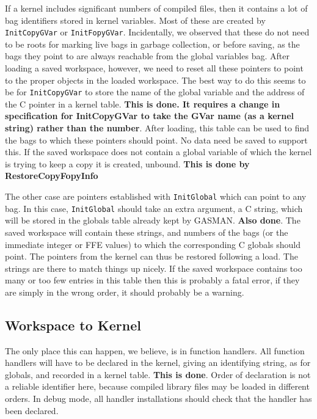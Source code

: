 \documentclass[11pt]{article}
\begin{document}
If a kernel includes significant numbers of compiled files, then it
contains a lot of bag identifiers stored in kernel variables. Most of
these are created by \verb|InitCopyGVar| or
\verb|InitFopyGVar|. Incidentally, we observed that these do not need
to be roots for marking live bags in garbage collection, or before
saving, as the bags they point to are always reachable from the global
variables bag. After loading a saved workspace, however, we need to
reset all these pointers to point to the proper objects in the loaded
workspace.  The best way to do this seems to be for
\verb|InitCopyGVar| to store the name of the global variable and the
address of the C pointer in a kernel table. \textbf{This is done. It
requires a change in specification for InitCopyGVar to take the GVar
name (as a kernel string) rather than the number}. After loading, this
table can be used to find the bags to which these pointers should
point. No data need be saved to support this. If the saved workspace
does not contain a global variable of which the kernel is trying to
keep a copy it is created, unbound. \textbf{This is done by
RestoreCopyFopyInfo}

The other case are pointers established with \verb|InitGlobal| which
can point to any bag. In this case, \verb|InitGlobal| should take an
extra argument, a C string, which will be stored in the globals table
already kept by GASMAN. \textbf{Also done}. The saved workspace will
contain these strings, and numbers of the bags (or the immediate
integer or FFE values) to which the corresponding C globals should
point. The pointers from the kernel can thus be restored following a
load. The strings are there to match things up nicely. If the saved
workspace contains too many or too few entries in this table then this
is probably a fatal error, if they are simply in the wrong order, it
should probably be a warning.

\subsection{Workspace to Kernel}

The only place this can happen, we believe, is in function
handlers. All function handlers will have to be declared in the
kernel, giving an identifying string, as for globals, and recorded in
a kernel table. \textbf{This is done}. Order of declaration is not a reliable identifier
here, because compiled library files may be loaded in different
orders. In debug mode, all handler installations should check that the
handler has been declared.
\end{document}
